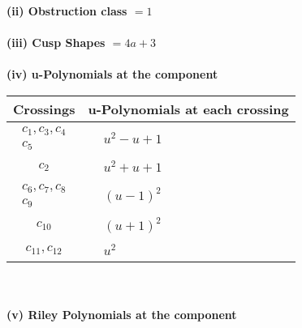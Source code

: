 \documentclass[1p]{elsarticle_modified}
\theoremstyle{definition}
\begin{document}
\flushleft \textbf{(ii) Obstruction class $= 1$}\\~\\
\flushleft \textbf{(iii) Cusp Shapes $= 4 a+3$}\\~\\
\newpage\renewcommand{\arraystretch}{1}
\flushleft \textbf{(iv) u-Polynomials at the component}\newline \\
\begin{tabular}{m{50pt}|m{274pt}}
Crossings & \hspace{64pt}u-Polynomials at each crossing \\
\hline $$\begin{aligned}c_{1},c_{3},c_{4}\\c_{5}\end{aligned}$$&$\begin{aligned}
&u^2- u+1
\end{aligned}$\\
\hline $$\begin{aligned}c_{2}\end{aligned}$$&$\begin{aligned}
&u^2+u+1
\end{aligned}$\\
\hline $$\begin{aligned}c_{6},c_{7},c_{8}\\c_{9}\end{aligned}$$&$\begin{aligned}
&(u-1)^2
\end{aligned}$\\
\hline $$\begin{aligned}c_{10}\end{aligned}$$&$\begin{aligned}
&(u+1)^2
\end{aligned}$\\
\hline $$\begin{aligned}c_{11},c_{12}\end{aligned}$$&$\begin{aligned}
&u^2
\end{aligned}$\\
\hline
\end{tabular}\\~\\
\newpage\renewcommand{\arraystretch}{1}
\flushleft \textbf{(v) Riley Polynomials at the component}\newline \\
\end{document}
